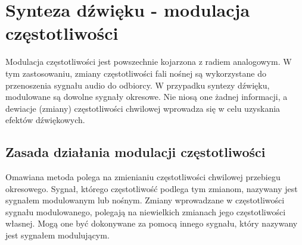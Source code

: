 \chapter{Synteza dźwięku - modulacja częstotliwości}\label{chapter_fm}
Modulacja częstotliwości jest powszechnie kojarzona z radiem analogowym. W tym zastosowaniu, zmiany częstotliwości fali nośnej są wykorzystane do przenoszenia sygnału audio do odbiorcy. W przypadku syntezy dźwięku, modulowane są dowolne sygnały okresowe. Nie niosą one żadnej informacji, a dewiacje (zmiany) częstotliwości chwilowej wprowadza się w celu uzyskania efektów dźwiękowych.
\section{Zasada działania modulacji częstotliwości}
Omawiana metoda polega na zmienianiu częstotliwości chwilowej przebiegu okresowego. Sygnał, którego częstotliwość podlega tym zmianom, nazywany jest sygnałem modulowanym lub nośnym. Zmiany wprowadzane w częstotliwości sygnału modulowanego, polegają na niewielkich zmianach jego częstotliwości własnej. Mogą one być dokonywane za pomocą innego sygnału, który nazywany jest sygnałem modulującym. 
